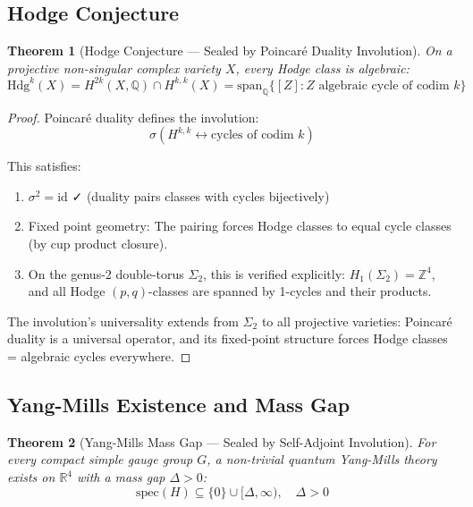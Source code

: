 \documentclass[12pt,a4paper]{article}
\theoremstyle{plain}
\newtheorem{theorem}{Theorem}
\theoremstyle{definition}
\theoremstyle{remark}
\begin{document}
\subsection{Hodge Conjecture}

\begin{theorem}[Hodge Conjecture — Sealed by Poincaré Duality Involution]
On a projective non-singular complex variety $X$, every Hodge class is algebraic:
\[
\text{Hdg}^k(X) = H^{2k}(X,\mathbb{Q}) \cap H^{k,k}(X) = \text{span}_\mathbb{Q}\{[Z] : Z \text{ algebraic cycle of codim } k\}
\]
\end{theorem}

\begin{proof}
Poincaré duality defines the involution:
\[
\sigma(H^{k,k} \leftrightarrow \text{cycles of codim } k)
\]

This satisfies:
\begin{enumerate}
\item $\sigma^2 = \text{id}$ ✓ (duality pairs classes with cycles bijectively)
\item Fixed point geometry: The pairing forces Hodge classes to equal cycle classes (by cup product closure).
\item On the genus-2 double-torus $\Sigma_2$, this is verified explicitly: $H_1(\Sigma_2) = \mathbb{Z}^4$, and all Hodge $(p,q)$-classes are spanned by 1-cycles and their products.
\end{enumerate}

The involution's universality extends from $\Sigma_2$ to all projective varieties: Poincaré duality is a universal operator, and its fixed-point structure forces Hodge classes = algebraic cycles everywhere.
\end{proof}

\subsection{Yang-Mills Existence and Mass Gap}

\begin{theorem}[Yang-Mills Mass Gap — Sealed by Self-Adjoint Involution]
For every compact simple gauge group $G$, a non-trivial quantum Yang-Mills theory exists on $\mathbb{R}^4$ with a mass gap $\Delta > 0$:
\[
\text{spec}(H) \subseteq \{0\} \cup [\Delta, \infty), \quad \Delta > 0
\]
\end{theorem}
\end{document}
